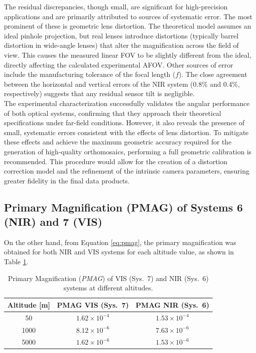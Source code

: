 \noindent The residual discrepancies, though small, are significant for high-precision applications and are primarily attributed to sources of systematic error. The most prominent of these is geometric lens distortion. The theoretical model assumes an ideal pinhole projection, but real lenses introduce distortions (typically barrel distortion in wide-angle lenses) that alter the magnification across the field of view. This causes the measured linear FOV to be slightly different from the ideal, directly affecting the calculated experimental AFOV. Other sources of error include the manufacturing tolerance of the focal length ($f$). The close agreement between the horizontal and vertical errors of the NIR system (0.8\% and 0.4\%, respectively) suggests that any residual sensor tilt is negligible.\\

\noindent The experimental characterization successfully validates the angular performance of both optical systems, confirming that they approach their theoretical specifications under far-field conditions. However, it also reveals the presence of small, systematic errors consistent with the effects of lens distortion. To mitigate these effects and achieve the maximum geometric accuracy required for the generation of high-quality orthomosaics, performing a full geometric calibration is recommended. This procedure would allow for the creation of a distortion correction model and the refinement of the intrinsic camera parameters, ensuring greater fidelity in the final data products.\\

\subsection{Primary Magnification (PMAG) of Systems 6 (NIR) and 7 (VIS)}
\label{sec:pmag}

\noindent On the other hand, from Equation \ref{eq:pmag}, the primary magnification was obtained for both NIR and VIS systems for each altitude value, as shown in Table \ref{tab:pmag_sys67}.\\

\begin{table}[H]
\centering
\caption{Primary Magnification (\textit{PMAG}) of VIS (Sys.~7) and NIR (Sys.~6) systems at different altitudes.}
\label{tab:pmag_sys67}
\begin{tabular}{|c|c|c|}
    \hline
    \rowcolor[HTML]{EFEFEF}
    \textbf{Altitude [m]} & \textbf{PMAG VIS (Sys.~7)} & \textbf{PMAG NIR (Sys.~6)} \\
    \hline
    50   & $1.62\times10^{-4}$ & $1.53\times10^{-4}$ \\
    1000 & $8.12\times10^{-6}$ & $7.63\times10^{-6}$ \\
    5000 & $1.62\times10^{-6}$ & $1.53\times10^{-6}$ \\
    \hline
\end{tabular}
\end{table}

